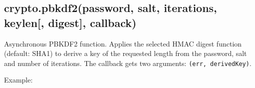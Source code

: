 \begin{Shaded}
\begin{Highlighting}[]
 \NormalTok{(}\NormalTok{);}
 \NormalTok{(}\NormalTok{);}
 \NormalTok{(}\NormalTok{);}

\NormalTok{();}
\NormalTok{();}

 \NormalTok{(}\NormalTok{(), }\NormalTok{, }\NormalTok{);}
 \NormalTok{(}\NormalTok{(), }\NormalTok{, }\NormalTok{);}

\end{Highlighting}
\end{Shaded}

\subsection{crypto.pbkdf2(password, salt, iterations, keylen{[},
digest{]},
callback)}\label{crypto.pbkdf2password-salt-iterations-keylen-digest-callback}

Asynchronous PBKDF2 function. Applies the selected HMAC digest function
(default: SHA1) to derive a key of the requested length from the
password, salt and number of iterations. The callback gets two
arguments: \texttt{(err,\ derivedKey)}.

Example:

\begin{Shaded}
\begin{Highlighting}[]
\NormalTok{(}\NormalTok{, }\NormalTok{, }\NormalTok{, }\NormalTok{, }\NormalTok{, }
   
     
  \NormalTok{(}\NormalTok{(}\NormalTok{));  }
\NormalTok{\});}
\end{Highlighting}
\end{Shaded}

